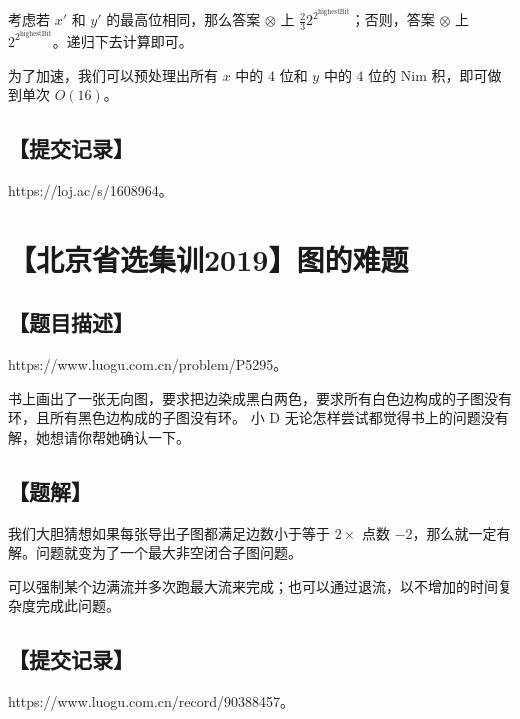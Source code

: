 \documentclass[UTF8,12pt,a4paper]{ctexart}
\begin{document}
	考虑若 $x'$ 和 $y'$ 的最高位相同，那么答案 $\otimes $ 上 $\frac 23 2^{2^{\mathrm{highestBit}}}$；否则，答案 $\otimes $ 上 $2^{2^{\mathrm{highestBit}}}$。递归下去计算即可。
	
	为了加速，我们可以预处理出所有 $x$ 中的 $4$ 位和 $y$ 中的 $4$ 位的 Nim 积，即可做到单次 $O(16)$。
	
	\subsection*{【提交记录】}
	
	https://loj.ac/s/1608964。
	
	
	\section*{【北京省选集训2019】图的难题}
	
	\subsection*{【题目描述】}
	
	https://www.luogu.com.cn/problem/P5295。
	
	书上画出了一张无向图，要求把边染成黑白两色，要求所有白色边构成的子图没有环，且所有黑色边构成的子图没有环。  
	小 D 无论怎样尝试都觉得书上的问题没有解，她想请你帮她确认一下。
	
	\subsection*{【题解】}
	
	我们大胆猜想如果每张导出子图都满足边数小于等于 $2\times$ 点数 $-2$，那么就一定有解。问题就变为了一个最大非空闭合子图问题。
	
	可以强制某个边满流并多次跑最大流来完成；也可以通过退流，以不增加的时间复杂度完成此问题。
	
	\subsection*{【提交记录】}
	
	https://www.luogu.com.cn/record/90388457。
	
\end{document}

